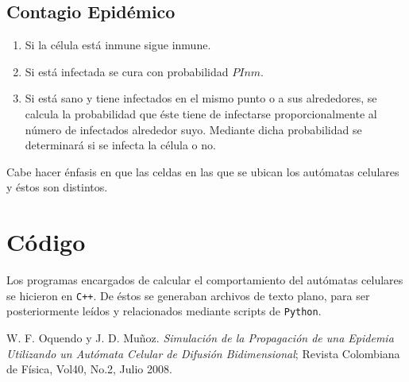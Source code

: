 \documentclass[twoside,twocolumn]{article}
\newcommand{\code}[1]{\colorbox{light-gray}{\texttt{#1}}}
\begin{document}
\subsection{Contagio Epidémico}
\begin{enumerate}
\item Si la célula está inmune sigue inmune.
\item Si está infectada se cura con probabilidad $PInm$.
\item Si está sano y tiene infectados en el mismo punto o a sus alrededores, se calcula la probabilidad que éste tiene de infectarse proporcionalmente al número de infectados alrededor suyo. Mediante dicha probabilidad se determinará si se infecta la célula o no.
\end{enumerate}
Cabe hacer énfasis en que las celdas en las que se ubican los autómatas celulares y éstos son distintos.

\section{Código}
Los programas encargados de calcular el comportamiento del autómatas celulares se hicieron en \code{C++}. De éstos se generaban archivos de texto plano, para ser posteriormente leídos y relacionados mediante scripts de \code{Python}.
\begin{thebibliography}{99} %

W. F. Oquendo y J. D. Muñoz.  \emph{Simulación de la Propagación de una Epidemia Utilizando un Autómata Celular de Difusión Bidimensional}; Revista Colombiana de Física, Vol40, No.2, Julio 2008.

\end{thebibliography}
\end{document}
